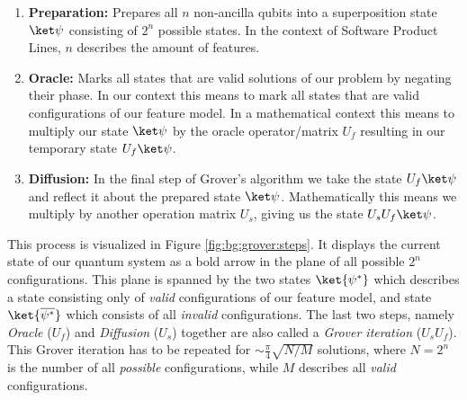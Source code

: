 \begin{enumerate}
    \item \textbf{Preparation:} Prepares all $n$ non-ancilla qubits into a superposition state $\ket\psi$ consisting of $2^n$ possible states. In the context of Software Product Lines, $n$ describes the amount of features.
    \item \textbf{Oracle:} Marks all states that are valid solutions of our problem by negating their phase. In our context this means to mark all states that are valid configurations of our feature model. In a mathematical context this means to multiply our state $\ket\psi$ by the oracle operator/matrix $U_f$ resulting in our temporary state $U_f\ket\psi$.
    \item \textbf{Diffusion:} In the final step of Grover's algorithm we take the state $U_f\ket\psi$ and reflect it about the prepared state $\ket\psi$. Mathematically this means we multiply by another operation matrix $U_s$, giving us the state $U_sU_f\ket\psi$.
\end{enumerate}

This process is visualized in Figure \ref{fig:bg:grover:steps}. It displays the current state of our quantum system as a bold arrow in the plane of all possible $2^n$ configurations.
This plane is spanned by the two states $\ket{\psi^*}$ which describes a state consisting only of \textit{valid} configurations of our feature model, and state $\ket{\overline{\psi^*}}$ which consists of all \textit{invalid} configurations.
The last two steps, namely \textit{Oracle} ($U_f$) and \textit{Diffusion} ($U_s$) together are also called a \textit{Grover iteration} ($U_sU_f$).
This Grover iteration has to be repeated for  $\sim\frac{\pi}{4}\sqrt{N/M}$ solutions, where $N=2^n$ is the number of all \textit{possible} configurations, while $M$ describes all \textit{valid} configurations.

